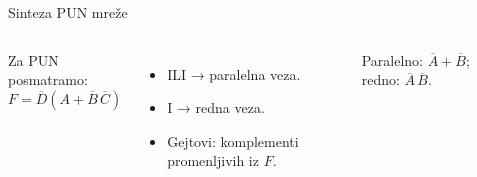 \begin{frame}[label=09_3-s032]{Sinteza PUN mreže}
\begin{columns}[c,onlytextwidth]
Za PUN posmatramo:
\[F=\overline D(A+\overline B\,\overline C)\]
\begin{itemize}
\item ILI → paralelna veza.
\item I → redna veza.
\item Gejtovi: komplementi promenljivih iz $F$.
\end{itemize}
Paralelno: $\overline A+\overline B$; redno: $\overline A\,\overline B$.
\begin{center}

\end{center}
\end{columns}
\end{frame}
